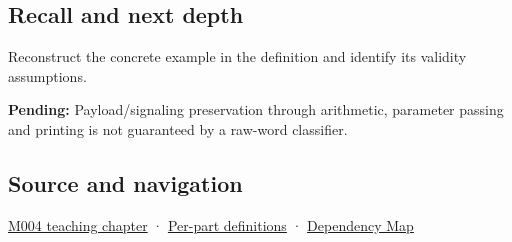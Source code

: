 \subsection{Recall and next depth}\label{appendix-d6607cc4c235-recall-and-next-depth}

Reconstruct the concrete example in the definition and identify its validity assumptions.

\textbf{Pending:} Payload/signaling preservation through arithmetic, parameter passing and printing is not guaranteed by a raw-word classifier.

\subsection{Source and navigation}\label{appendix-d6607cc4c235-source-and-navigation}

\hyperref[01-foundations-i-ch001-a-stretching-ruler-for-real-valued-quantities]{M004 teaching chapter} · \hyperref[appendix-fd090d982a15-m004---parts-61-76]{Per-part definitions} · \hyperref[appendix-4ad47bdd269a]{Dependency Map}
